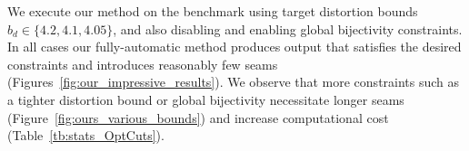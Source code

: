 We execute our method on the benchmark using target distortion bounds $b_d \in \{4.2, 4.1, 4.05\}$, and also disabling and enabling global bijectivity constraints. 
In all cases our fully-automatic method produces output that satisfies the desired constraints and introduces reasonably few seams (Figures~\ref{fig:our_impressive_results}). We observe that more constraints such as a tighter distortion bound or global bijectivity necessitate longer seams (Figure~\ref{fig:ours_various_bounds}) and increase computational cost (Table~\ref{tb:stats_OptCuts}).



